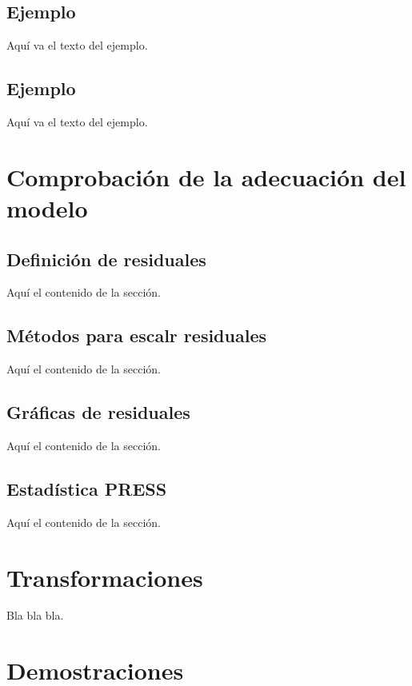 \documentclass[10pt,]{krantz}
\begin{document}
\section*{Ejemplo}\label{ejemplo-2}


Aquí va el texto del ejemplo.

\section*{Ejemplo}\label{ejemplo-3}


Aquí va el texto del ejemplo.

\chapter{Comprobación de la adecuación del modelo}\label{resid}

\section{Definición de residuales}\label{definicion-de-residuales}

Aquí el contenido de la sección.

\section{Métodos para escalr
residuales}\label{metodos-para-escalr-residuales}

Aquí el contenido de la sección.

\section{Gráficas de residuales}\label{graficas-de-residuales}

Aquí el contenido de la sección.

\section{Estadística PRESS}\label{estadistica-press}

Aquí el contenido de la sección.

\chapter{Transformaciones}\label{transf}

Bla bla bla.

\chapter{Demostraciones}\label{demos}
\end{document}
